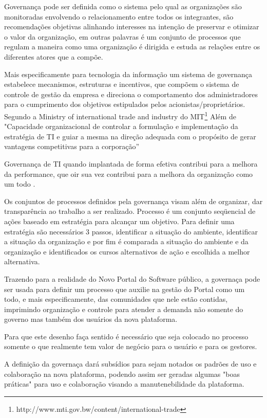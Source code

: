 Governança pode ser definida como o sistema pelo qual as organizações 
são monitoradas envolvendo o relacionamento entre todos os integrantes,
são recomendações objetivas alinhando interesses na intenção de preservar e 
otimizar o valor da organização, em outras palavras é um conjunto de processos
que regulam a maneira como uma organização é dirigida e estuda as relações entre 
os diferentes atores que a compõe.\cite{molinarogestao}

Mais especificamente para tecnologia da informação um sistema de governança
estabelece mecanismos, estruturas e incentivos, que compõem o sistema de controle de 
gestão da empresa e direciona o comportamento dos administradores para o cumprimento 
dos objetivos estipulados pelos acionistas/proprietários.\cite{martin2004governancca}
%
Segundo a Ministry of international trade and industry do MIT\footnote{http://www.mti.gov.bw/content/international-trade} 
Além de "Capacidade organizacional de controlar a formulação e implementação da 
estratégia de TI e guiar a mesma na direção adequada com o propósito de gerar 
vantagens competitivas para a corporação”

Governança de TI quando implantada de forma efetiva contribui para a melhora da 
performance, que oir sua vez contribui para a melhora da organização como um todo
\cite{tres2014information}.

Os conjuntos de processos definidos pela governança visam além de organizar, 
dar transparência ao trabalho a ser realizado.
%
Processo é um conjunto seqüencial de ações baseado em estratégia para alcançar
um objetivo. Para definir uma estratégia são necessários 3 passos, identificar a
situação do ambiente, identificar a situação da organização e por fim é comparada
a situação do ambiente e da organização e identificados os cursos alternativos
de ação e escolhida a melhor alternativa.\cite{molinarogestao}

Trazendo para a realidade do Novo Portal do Software público, a governaça pode ser usada para 
definir um processo que auxilie na gestão do Portal como um todo, e mais especificamente,
das comunidades que nele estão contidas, imprimindo organização e controle para atender 
a demanda não somente do governo mas também dos usuários da nova plataforma.

Para que este desenho faça sentido é necessário que seja colocado no processo somente o que 
realmente tem valor de negócio para o usuário e para os gestores.

A definição da governaça dará subsídios para sejam notados os padrões de uso e colaboração na
nova plataforma, podendo assim ser geradas algumas "boas práticas" para uso e colaboração
visando a manutenebilidade da plataforma.


